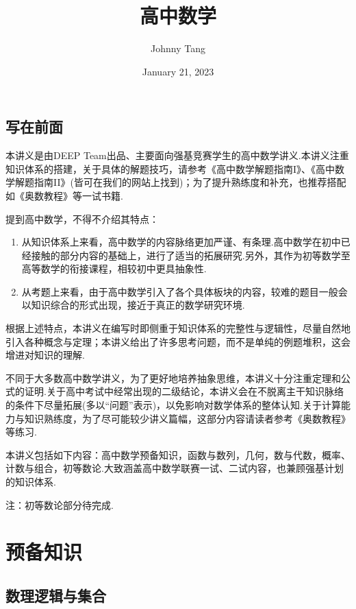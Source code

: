 \documentclass[lang=cn, zihao=5]{elegantbook}
\title{高中数学}
\author{Johnny Tang}
\institute{DEEP Team}
\date{January 21, 2023}
\begin{document}
\maketitle

\frontmatter

\mainmatter

\chapter*{写在前面}

本讲义是由DEEP Team出品、主要面向强基竞赛学生的高中数学讲义.本讲义注重知识体系的搭建，关于具体的解题技巧，请参考《高中数学解题指南I》、《高中数学解题指南II》(皆可在我们的网站上找到)；为了提升熟练度和补充，也推荐搭配如《奥数教程》等一试书籍.

提到高中数学，不得不介绍其特点：
\begin{enumerate}
	\item 从知识体系上来看，高中数学的内容脉络更加严谨、有条理.高中数学在初中已经接触的部分内容的基础上，进行了适当的拓展研究.另外，其作为初等数学至高等数学的衔接课程，相较初中更具抽象性.
	\item 从考题上来看，由于高中数学引入了各个具体板块的内容，较难的题目一般会以知识综合的形式出现，接近于真正的数学研究环境.
\end{enumerate}
根据上述特点，本讲义在编写时即侧重于知识体系的完整性与逻辑性，尽量自然地引入各种概念与定理；本讲义给出了许多思考问题，而不是单纯的例题堆积，这会增进对知识的理解.

不同于大多数高中数学讲义，为了更好地培养抽象思维，本讲义十分注重定理和公式的证明.关于高中考试中经常出现的二级结论，本讲义会在不脱离主干知识脉络的条件下尽量拓展(多以“问题”表示)，以免影响对数学体系的整体认知.关于计算能力与知识熟练度，为了尽可能较少讲义篇幅，这部分内容请读者参考《奥数教程》等练习.

本讲义包括如下内容：高中数学预备知识，函数与数列，几何，数与代数，概率、计数与组合，初等数论.大致涵盖高中数学联赛一试、二试内容，也兼顾强基计划的知识体系.

\tableofcontents

注：初等数论部分待完成.

\newpage

\part{预备知识}

\setcounter{chapter}{-1}
\chapter{数理逻辑与集合}
\end{document}
